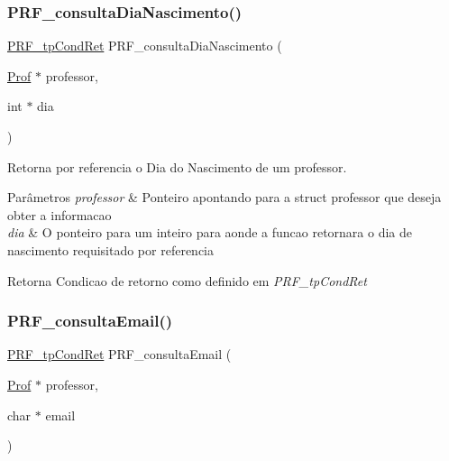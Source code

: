 \subsubsection{\texorpdfstring{P\+R\+F\+\_\+consulta\+Dia\+Nascimento()}{PRF\_consultaDiaNascimento()}}
{\footnotesize\ttfamily \hyperlink{group__modulo_professor_ga777e215896d573d2e99d98793b1f0ed1}{P\+R\+F\+\_\+tp\+Cond\+Ret} P\+R\+F\+\_\+consulta\+Dia\+Nascimento (\begin{DoxyParamCaption}\item[{\hyperlink{structprof}{Prof} $\ast$}]{professor,  }\item[{int $\ast$}]{dia }\end{DoxyParamCaption})}



Retorna por referencia o Dia do Nascimento de um professor. 


\begin{DoxyParams}{Parâmetros}
{\em professor} & Ponteiro apontando para a struct professor que deseja obter a informacao \\
\hline
{\em dia} & O ponteiro para um inteiro para aonde a funcao retornara o dia de nascimento requisitado por referencia \\
\hline
\end{DoxyParams}
\begin{DoxyReturn}{Retorna}
Condicao de retorno como definido em {\itshape P\+R\+F\+\_\+tp\+Cond\+Ret} 
\end{DoxyReturn}
\mbox{\label{group__funcoes_consulta_ga8f82f0083292830b07ae87886b1391f4}} 
\subsubsection{\texorpdfstring{P\+R\+F\+\_\+consulta\+Email()}{PRF\_consultaEmail()}}
{\footnotesize\ttfamily \hyperlink{group__modulo_professor_ga777e215896d573d2e99d98793b1f0ed1}{P\+R\+F\+\_\+tp\+Cond\+Ret} P\+R\+F\+\_\+consulta\+Email (\begin{DoxyParamCaption}\item[{\hyperlink{structprof}{Prof} $\ast$}]{professor,  }\item[{char $\ast$}]{email }\end{DoxyParamCaption})}



